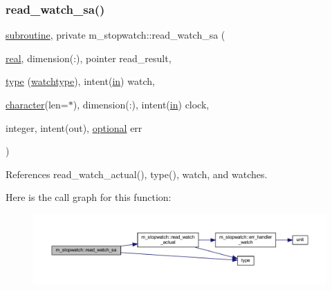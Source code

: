 \subsubsection{\texorpdfstring{read\+\_\+watch\+\_\+sa()}{read\_watch\_sa()}}
{\footnotesize\ttfamily \hyperlink{M__stopwatch_83_8txt_acfbcff50169d691ff02d4a123ed70482}{subroutine}, private m\+\_\+stopwatch\+::read\+\_\+watch\+\_\+sa (\begin{DoxyParamCaption}\item[{\hyperlink{read__watch_83_8txt_abdb62bde002f38ef75f810d3a905a823}{real}, dimension(\+:), pointer}]{read\+\_\+result,  }\item[{\hyperlink{stop__watch_83_8txt_a70f0ead91c32e25323c03265aa302c1c}{type} (\hyperlink{structm__stopwatch_1_1watchtype}{watchtype}), intent(\hyperlink{M__journal_83_8txt_afce72651d1eed785a2132bee863b2f38}{in})}]{watch,  }\item[{\hyperlink{option__stopwatch_83_8txt_abd4b21fbbd175834027b5224bfe97e66}{character}(len=$\ast$), dimension(\+:), intent(\hyperlink{M__journal_83_8txt_afce72651d1eed785a2132bee863b2f38}{in})}]{clock,  }\item[{integer, intent(out), \hyperlink{option__stopwatch_83_8txt_aa4ece75e7acf58a4843f70fe18c3ade5}{optional}}]{err }\end{DoxyParamCaption})\hspace{0.3cm}{\ttfamily [private]}}



References read\+\_\+watch\+\_\+actual(), type(), watch, and watches.

Here is the call graph for this function\+:
\nopagebreak
\begin{figure}[H]
\begin{center}
\leavevmode
\includegraphics[width=350pt]{namespacem__stopwatch_aeff00ff26ea56c282f257e7fa03d2319_cgraph}
\end{center}
\end{figure}
\mbox{\label{namespacem__stopwatch_a89bcd606b0a234679db7c5809e0560f3}} 

